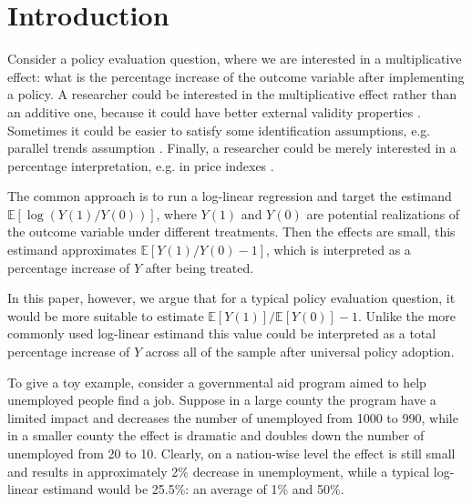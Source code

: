 \documentclass[a4paper,12pt]{article}
\theoremstyle{plain}
\begin{document}
\section{Introduction}



Consider a policy evaluation question, where we are interested in a multiplicative effect: what is the percentage increase of the outcome variable after implementing a policy. A researcher could be interested in the multiplicative effect rather than an additive one, because it could have better external validity properties \citep{hernan2010causal,bareinboim2014transportability,dahabreh2019extending}. Sometimes it could be easier to satisfy some identification assumptions, e.g. parallel trends assumption \citep{wooldridgeSimpleApproachesNonlinear2023}. Finally, a researcher could be merely interested in a percentage interpretation, e.g. in price indexes \citep{diamond2021standard}.


The common approach is to run a log-linear regression and target the estimand $\mathbb{E}[\log(Y(1)/Y(0))]$, where $Y(1)$ and $Y(0)$ are potential realizations of the outcome variable under different treatments. Then the effects are small, this estimand approximates $\mathbb{E}[Y(1)/Y(0) - 1]$, which is interpreted as a percentage increase of $Y$ after being treated.

In this paper, however, we argue that for a typical policy evaluation question, it would be more suitable to estimate $\mathbb{E}[Y(1)]/\mathbb{E}[Y(0)] - 1$. Unlike the more commonly used log-linear estimand this value could be interpreted as a total percentage increase of $Y$ across all of the sample after universal policy adoption.

To give a toy example, consider a governmental aid program aimed to help unemployed people find a job. Suppose in a large county the program have a limited impact and decreases the number of unemployed from 1000 to 990, while in a smaller county the effect is dramatic and doubles down the number of unemployed from 20 to 10. Clearly, on a nation-wise level the effect is still small and results in approximately 2\% decrease in unemployment, while a typical log-linear estimand would be 25.5\%: an average of 1\% and 50\%.
\end{document}
